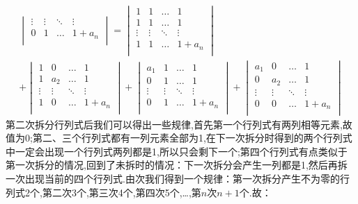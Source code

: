 \begin{examp}
\begin{gather*}
\begin{vmatrix}
            \vdots   &   \vdots   &   \ddots   &   \vdots   \\
            0   &   1   &   \dots   &   1+a_n   \\
        \end{vmatrix}
        =\begin{vmatrix}
            1   &   1   &   \dots   &   1   \\
            1   &   1   &   \dots   &   1   \\
            \vdots   &   \vdots   &   \ddots   &   \vdots   \\
            1   &   1   &   \dots   &   1+a_n   \\
        \end{vmatrix}\\
        +\begin{vmatrix}
            1   &   0   &   \dots   &   1   \\
            1   &   a_2   &   \dots   &   1   \\
            \vdots   &   \vdots   &   \ddots   &   \vdots   \\
            1   &   0   &   \dots   &   1+a_n   \\
        \end{vmatrix}+
        \begin{vmatrix}
            a_1   &   1   &   \dots   &   1   \\
            0   &   1   &   \dots   &   1   \\
            \vdots   &   \vdots   &   \ddots   &   \vdots   \\
            0   &   1   &   \dots   &   1+a_n   \\
        \end{vmatrix}+
        \begin{vmatrix}
            a_1   &   0   &   \dots   &   1   \\
            0   &   a_2   &   \dots   &   1   \\
            \vdots   &   \vdots   &   \ddots   &   \vdots   \\
            0   &   0   &   \dots   &   1+a_n   \\
        \end{vmatrix}
    \end{gather*}
    第二次拆分行列式后我们可以得出一些规律,首先第一个行列式有两列相等元素,故值为0;第二、三个行列式都有一列元素全部为1,在下一次拆分时得到的两个行列式中一定会出现一个行列式两列都是1,所以只会剩下一个;第四个行列式有点类似于第一次拆分的情况,回到了未拆时的情况：下一次拆分会产生一列都是1,然后再拆一次出现当前的四个行列式.由次我们得到一个规律：第一次拆分产生不为零的行列式2个,第二次3个,第三次4个,第四次5个,\dots,第$n$次$n+1$个.故：

\end{examp}

